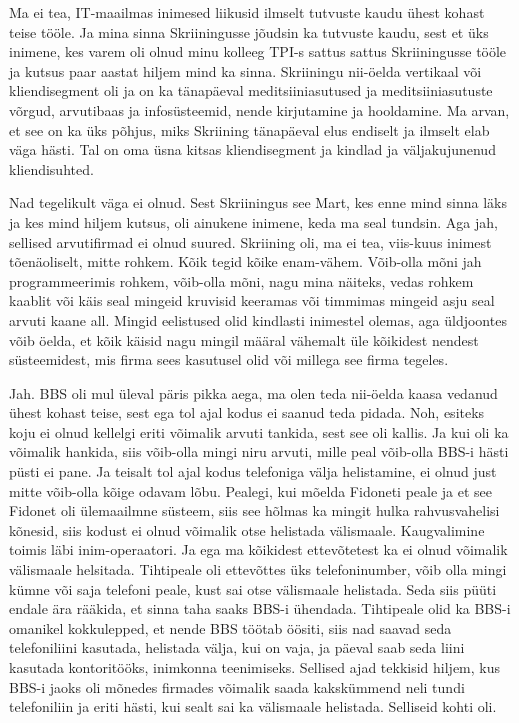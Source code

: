 
Ma ei tea, IT-maailmas inimesed liikusid ilmselt tutvuste kaudu ühest kohast teise tööle. Ja mina sinna Skriiningusse jõudsin ka  tutvuste kaudu, sest et üks inimene, kes varem oli olnud minu kolleeg TPI-s sattus sattus Skriiningusse tööle ja kutsus paar aastat hiljem mind ka sinna. Skriiningu nii-öelda vertikaal või kliendisegment oli ja on ka tänapäeval meditsiiniasutused ja meditsiiniasutuste võrgud, arvutibaas ja infosüsteemid, nende kirjutamine ja hooldamine. Ma arvan, et see on ka üks põhjus, miks Skriining tänapäeval elus endiselt ja ilmselt elab väga hästi. Tal on oma üsna kitsas kliendisegment ja kindlad ja väljakujunenud kliendisuhted.


Nad tegelikult väga ei olnud. Sest Skriiningus see Mart, kes enne mind sinna läks ja kes mind hiljem kutsus, oli ainukene inimene, keda ma seal tundsin. Aga jah, sellised arvutifirmad ei olnud suured. Skriining oli, ma ei tea, viis-kuus inimest tõenäoliselt, mitte rohkem. Kõik tegid kõike enam-vähem. Võib-olla mõni jah programmeerimis rohkem, võib-olla mõni, nagu mina näiteks, vedas rohkem kaablit või käis seal mingeid kruvisid keeramas või timmimas mingeid asju seal arvuti kaane all. Mingid eelistused olid kindlasti inimestel olemas, aga üldjoontes võib öelda, et kõik käisid nagu mingil määral vähemalt üle kõikidest nendest süsteemidest, mis firma  sees kasutusel olid või millega see firma tegeles.


Jah. BBS  oli mul üleval päris pikka aega, ma olen teda nii-öelda kaasa vedanud  ühest kohast teise, sest ega tol ajal kodus ei saanud teda pidada. Noh, esiteks koju ei olnud kellelgi eriti võimalik arvuti tankida, sest see oli kallis. Ja kui oli ka võimalik hankida, siis võib-olla mingi niru arvuti, mille peal võib-olla BBS-i hästi püsti ei pane. Ja teisalt tol ajal kodus telefoniga välja helistamine, ei olnud just mitte võib-olla kõige odavam lõbu. Pealegi, kui mõelda Fidoneti peale ja et see Fidonet  oli ülemaailmne süsteem, siis see hõlmas ka mingit hulka rahvusvahelisi kõnesid, siis kodust ei olnud võimalik otse helistada välismaale. Kaugvalimine toimis läbi inim-operaatori. Ja ega ma kõikidest ettevõtetest ka ei olnud võimalik välismaale helsitada. Tihtipeale oli ettevõttes üks telefoninumber, võib olla mingi kümne või saja telefoni peale, kust sai otse välismaale helistada. Seda siis püüti endale ära rääkida, et sinna taha saaks BBS-i ühendada. Tihtipeale olid ka BBS-i omanikel kokkulepped, et nende BBS töötab öösiti, siis nad saavad seda telefoniliini kasutada, helistada välja, kui on vaja, ja päeval saab seda liini kasutada kontoritööks, inimkonna teenimiseks. Sellised ajad tekkisid hiljem, kus BBS-i jaoks oli mõnedes firmades võimalik saada kakskümmend neli tundi telefoniliin ja eriti hästi, kui sealt sai ka välismaale helistada. Selliseid kohti oli. 

